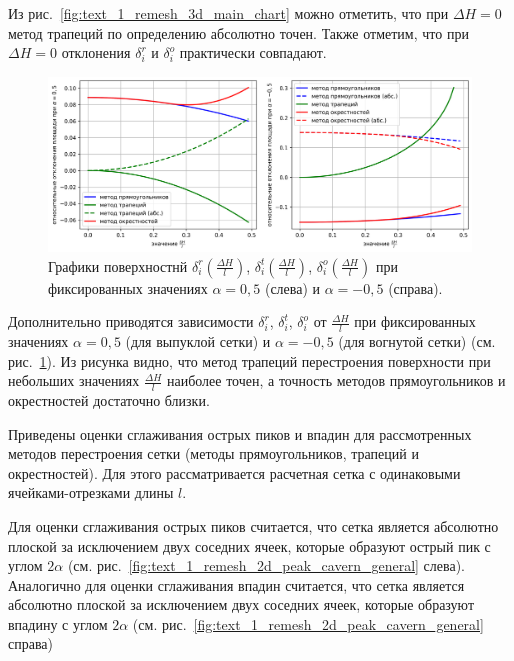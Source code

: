 \documentclass[a4paper,14pt]{extarticle}                     %
\theoremstyle{plain}                                         %
\begin{document}
Из рис.~\ref{fig:text_1_remesh_3d_main_chart} можно отметить, что при $\Delta H = 0$ метод трапеций по определению абсолютно точен.
Также отметим, что при $\Delta H = 0$ отклонения $\delta_i^r$ и $\delta_i^o$ практически совпадают.

\begin{figure}[ht]
\centering
\includegraphics[width=1.0\textwidth]{pics/text_1_remesh_2d/remesh_fix_alfa_chart.png}
\singlespacing
{}\caption{Графики поверхностнй $\delta_i^r(\frac{\Delta H}{l})$, $\delta_i^t(\frac{\Delta H}{l})$, $\delta_i^o(\frac{\Delta H}{l})$ при фиксированных значениях $\alpha = 0,5$ (слева) и $\alpha = -0,5$ (справа).}
\label{fig:text_1_remesh_fix_alfa_chart}
\end{figure}

Дополнительно приводятся зависимости $\delta_i^r$, $\delta_i^t$, $\delta_i^o$ от $\frac{\Delta H}{l}$ при фиксированных значениях $\alpha = 0,5$ (для выпуклой сетки) и $\alpha = -0,5$ (для вогнутой сетки) (см. рис.~\ref{fig:text_1_remesh_fix_alfa_chart}).
Из рисунка видно, что метод трапеций перестроения поверхности при небольших значениях $\frac{\Delta H}{l}$ наиболее точен, а точность методов прямоугольников и окрестностей достаточно близки.

Приведены оценки сглаживания острых пиков и впадин для рассмотренных методов перестроения сетки (методы прямоугольников, трапеций и окрестностей).
Для этого рассматривается расчетная сетка с одинаковыми ячейками-отрезками длины $l$.

Для оценки сглаживания острых пиков считается, что сетка является абсолютно плоской за исключением двух соседних ячеек, которые образуют острый пик с углом $2 \alpha$ (см. рис.~\ref{fig:text_1_remesh_2d_peak_cavern_general} слева).
Аналогично для оценки сглаживания впадин считается, что сетка является абсолютно плоской за исключением двух соседних ячеек, которые образуют впадину с углом $2 \alpha$ (см. рис.~\ref{fig:text_1_remesh_2d_peak_cavern_general} справа)
\end{document}
